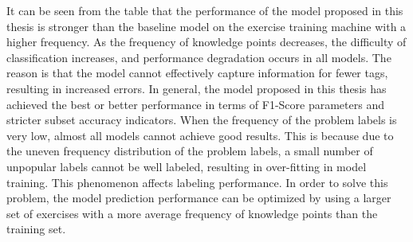 
It can be seen from the table that the performance of the model proposed in this thesis is stronger than the baseline model on the exercise training machine with a higher frequency. As the frequency of knowledge points decreases, the difficulty of classification increases, and performance degradation occurs in all models. The reason is that the model cannot effectively capture information for fewer tags, resulting in increased errors. In general, the model proposed in this thesis has achieved the best or better performance in terms of F1-Score parameters and stricter subset accuracy indicators. When the frequency of the problem labels is very low, almost all models cannot achieve good results. This is because due to the uneven frequency distribution of the problem labels, a small number of unpopular labels cannot be well labeled, resulting in over-fitting in model training. This phenomenon affects labeling performance. In order to solve this problem, the model prediction performance can be optimized by using a larger set of exercises with a more average frequency of knowledge points than the training set.

